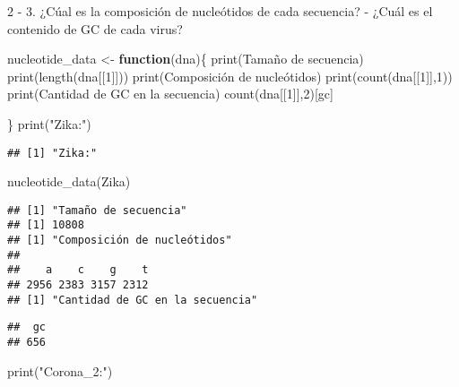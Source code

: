 \documentclass[
]{article}
\newenvironment{Shaded}{\begin{snugshade}}{\end{snugshade}}
\newcommand{\ControlFlowTok}[1]{\textcolor[rgb]{0.13,0.29,0.53}{\textbf{#1}}}
\newcommand{\DecValTok}[1]{\textcolor[rgb]{0.00,0.00,0.81}{#1}}
\newcommand{\FunctionTok}[1]{\textcolor[rgb]{0.00,0.00,0.00}{#1}}
\newcommand{\NormalTok}[1]{#1}
\newcommand{\OtherTok}[1]{\textcolor[rgb]{0.56,0.35,0.01}{#1}}
\newcommand{\StringTok}[1]{\textcolor[rgb]{0.31,0.60,0.02}{#1}}
\begin{document}
2 - 3. ¿Cúal es la composición de nucleótidos de cada secuencia? - ¿Cuál
es el contenido de GC de cada virus?

\begin{Shaded}
\begin{Highlighting}[]
\NormalTok{nucleotide\_data }\OtherTok{\textless{}{-}} \ControlFlowTok{function}\NormalTok{(dna)\{}
  \FunctionTok{print}\NormalTok{(}\StringTok{\textquotesingle{}Tamaño de secuencia\textquotesingle{}}\NormalTok{)}
  \FunctionTok{print}\NormalTok{(}\FunctionTok{length}\NormalTok{(dna[[}\DecValTok{1}\NormalTok{]]))}
  \FunctionTok{print}\NormalTok{(}\StringTok{\textquotesingle{}Composición de nucleótidos\textquotesingle{}}\NormalTok{)}
  \FunctionTok{print}\NormalTok{(}\FunctionTok{count}\NormalTok{(dna[[}\DecValTok{1}\NormalTok{]],}\DecValTok{1}\NormalTok{))}
  \FunctionTok{print}\NormalTok{(}\StringTok{\textquotesingle{}Cantidad de GC en la secuencia\textquotesingle{}}\NormalTok{)}
  \FunctionTok{count}\NormalTok{(dna[[}\DecValTok{1}\NormalTok{]],}\DecValTok{2}\NormalTok{)[}\StringTok{\textquotesingle{}gc\textquotesingle{}}\NormalTok{]}
  
\NormalTok{\}}
\FunctionTok{print}\NormalTok{(}\StringTok{"Zika:"}\NormalTok{)}
\end{Highlighting}
\end{Shaded}

\begin{verbatim}
## [1] "Zika:"
\end{verbatim}

\begin{Shaded}
\begin{Highlighting}[]
\FunctionTok{nucleotide\_data}\NormalTok{(Zika)}
\end{Highlighting}
\end{Shaded}

\begin{verbatim}
## [1] "Tamaño de secuencia"
## [1] 10808
## [1] "Composición de nucleótidos"
## 
##    a    c    g    t 
## 2956 2383 3157 2312 
## [1] "Cantidad de GC en la secuencia"
\end{verbatim}

\begin{verbatim}
##  gc 
## 656
\end{verbatim}

\begin{Shaded}
\begin{Highlighting}[]
\FunctionTok{print}\NormalTok{(}\StringTok{"Corona\_2:"}\NormalTok{)}
\end{Highlighting}
\end{Shaded}
\end{document}
